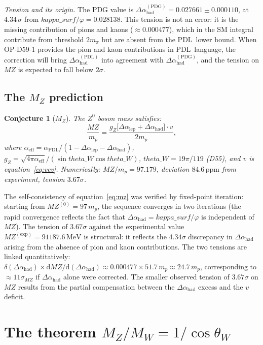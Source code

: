 \documentclass[12pt,a4paper]{article}
\newtheorem{conjecture}[theorem]{Conjecture}
\theoremstyle{remark}
\newcommand{\PDL}{\textsc{pdl}}
\newcommand{\ksurf}{\kappa_{\mathrm{surf}}}
\newcommand{\thetaW}{\theta_{W}}
\newcommand{\Dalep}{\Delta\alpha_{\mathrm{lep}}}
\newcommand{\Dahad}{\Delta\alpha_{\mathrm{had}}}
\newcommand{\MZ}{M_{Z}}
\newcommand{\vev}{v}
\newcommand{\alphaPDL}{\alpha_{\mathrm{PDL}}}
\newcommand{\ppm}{\,\mathrm{ppm}}
\newcommand{\MeV}{\,\mathrm{MeV}}
\newcommand{\mproton}{m_{p}}
\def\PDL{PDL}%
\def\MZ{MZ}%
\def\thetaW{theta\_W}%
\def\ksurf{kappa\_surf}%
\begin{document}
\emph{Tension and its origin.} The PDG value is $\Dahad^{(\mathrm{PDG})}=
0.027661\pm0.000110$, at $4.34\,\sigma$ from $\ksurf/\varphi=0.028138$.
This tension is not an error: it is the missing contribution of pions and
kaons ($\approx0.000477$), which in the SM integral contribute from threshold
$2m_{\pi}$ but are absent from the \PDL\ lower bound. When OP-D59-1 provides
the pion and kaon contributions in \PDL\ language, the correction will bring
$\Dahad^{(\mathrm{PDL})}$ into agreement with $\Dahad^{(\mathrm{PDG})}$, and
the tension on $\MZ$ is expected to fall below $2\sigma$.

\subsection{\texorpdfstring{The $M_Z$ prediction}{MZ prediction}}

\begin{conjecture}[\texorpdfstring{$M_Z$}{MZ}]\label{conj:mz}
The $Z^{0}$ boson mass satisfies:
\begin{equation}\label{eq:mz}
\frac{\MZ}{\mproton} = \frac{g_{Z}\bigl[\Dalep+\Dahad\bigr]\cdot\vev}{2\mproton},
\end{equation}
where $\alpha_{\mathrm{eff}}=\alphaPDL/(1-\Dalep-\Dahad)$,
$g_{Z}=\sqrt{4\pi\alpha_{\mathrm{eff}}}/(\sin\thetaW\cos\thetaW)$,
$\thetaW=19\pi/119$ \emph{(D55)}, and $\vev$ is equation~\eqref{eq:vev}.
Numerically: $\MZ/\mproton=97.179$, deviation $84.6\ppm$ from experiment,
tension $3.67\sigma$.
\end{conjecture}

The self-consistency of equation~\eqref{eq:mz} was verified by fixed-point
iteration: starting from $\MZ^{(0)}=97\,\mproton$, the sequence converges in
two iterations (the rapid convergence reflects the fact that $\Dahad=
\ksurf/\varphi$ is independent of $\MZ$). The tension of $3.67\sigma$
against the experimental value $\MZ^{(\mathrm{exp})}=91187.6\MeV$ is
structural: it reflects the $4.34\sigma$ discrepancy in $\Dahad$ arising from
the absence of pion and kaon contributions. The two tensions are linked
quantitatively: $\delta(\Dahad)\times\mathrm{d}\MZ/\mathrm{d}(\Dahad)\approx
0.000477\times51.7\,\mproton\approx24.7\,\mproton$, corresponding to
$\approx11\sigma_{\MZ}$ if $\Dahad$ alone were corrected. The smaller observed
tension of $3.67\sigma$ on $\MZ$ results from the partial compensation between
the $\Dahad$ excess and the $\vev$ deficit.

\section{The theorem \texorpdfstring{$M_Z/M_W=1/\cos\theta_W$}{MZ/MW}}
\end{document}

